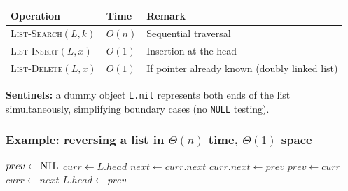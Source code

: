 \begin{center}
\renewcommand{\arraystretch}{1.25}
\begin{tabular}{lll}
\toprule
\textbf{Operation} & \textbf{Time} & \textbf{Remark} \\
\midrule
\textsc{List-Search}$(L, k)$  & $O(n)$ & Sequential traversal \\
\textsc{List-Insert}$(L, x)$  & $O(1)$ & Insertion at the head \\
\textsc{List-Delete}$(L, x)$  & $O(1)$ & If pointer already known (doubly linked list) \\
\bottomrule
\end{tabular}
\end{center}

\textbf{Sentinels:} a dummy object \texttt{L.nil} represents both ends
of the list simultaneously, simplifying boundary cases (no \texttt{NULL} testing).

\subsubsection{Example: reversing a list in $\Theta(n)$ time, $\Theta(1)$ space}

\begin{algorithm}[H]
\caption{Reverse-List($L$)}
\begin{algorithmic}[1]
\State $prev \leftarrow \textsc{NIL}$
\State $curr \leftarrow L.head$
    \State $next \leftarrow curr.next$
    \State $curr.next \leftarrow prev$   
    \State $prev \leftarrow curr$
    \State $curr \leftarrow next$
\EndWhile
\State $L.head \leftarrow prev$
\end{algorithmic}
\end{algorithm}

\begin{center}
\end{center}

